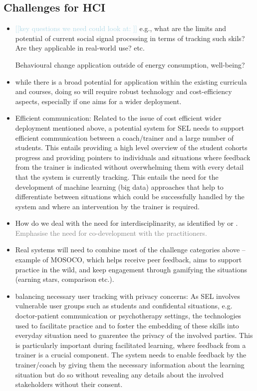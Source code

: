 \documentclass[prodmode,acmtochi]{acmsmall}
\newcommand{\todo}[1]{\textrm{\textrm{\textcolor{LightBlue}{[[#1]]} } } }
\newcommand{\rephrase}[1]{\textrm{\textrm{\textcolor{gray}{#1}}}}
\begin{document}
\subsection{Challenges for HCI }
        \begin{itemize}
                \item \todo{key questions we need could look at: } e.g., what are the limits and potential of current social signal processing in terms of tracking such skils? Are they applicable in real-world use? etc. 

                Behavioural change application outside of energy consumption, well-being? 
                \item while there is a broad potential for application within the existing curricula and courses, doing so will require robust technology and cost-efficiency aspects, especially if one aims for a wider deployment.
\item Efficient communication: Related to the issue of cost efficient wider deployment mentioned above, a potential system for SEL needs to support efficient communication between a coach/trainer and a large number of students. This entails providing a high level overview of the student cohorts progress and providing pointers to individuals and situations where feedback from the trainer is indicated without overwhelming them with every detail that the system is currently tracking. This entails the need for the development of machine learning (big data) approaches that help to differentiate between situations which could be successfully handled by the system and where an intervention by the trainer is required.   
                \item How do we deal with the need for interdisciplinarity, as identified by  or . \rephrase{Emphasise the need for co-development with the practitioners. }
                \item Real systems will need to combine most of the challenge categories above -- example of MOSOCO, which helps receive peer feedback, aims to support practice in the wild, and keep engagement through gamifying the situations (earning stars, comparison etc.). 
\item balancing necessary user tracking with privacy concerns:  As SEL involves vulnerable user groups such as students and confidental situations, e.g. doctor-patient communication or psychotherapy settings, the technologies used to facilitate practice and to foster the embedding of these skills into everyday situation need to guarentee the privacy of the involved parties. This is particularly important during facilitated learning, where feedback from a trainer is a crucial component. The system needs to enable feedback by the trainer/coach by giving them the necessary information about the learning situation but do so without revealing any details about the involved stakeholders without their consent. 

        \end{itemize}
\end{document}
